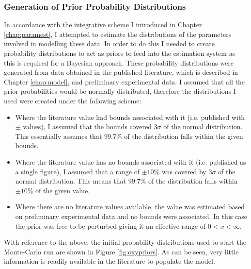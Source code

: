 \subsubsection{Generation of Prior Probability Distributions}
In accordance with the integrative scheme I introduced in Chapter \ref{chap:paramest}, I attempted to estimate the distributions of the parameters involved in modelling these data. In order to do this I needed to create probability distributions to act as priors to feed into the estimation system as this is required for a Bayesian approach. These probability distributions were generated from data obtained in the published literature, which is described in Chapter \ref{chap:model}, and preliminary experimental data. I assumed that all the prior probabilities would be normally distributed, therefore the distributions I used were created under the following scheme:
\begin{itemize}
	\item Where the literature value had bounds associated with it (i.e. published with $\pm{}$ values), I assumed that the bounds covered $3 \sigma$ of the normal distribution. This essentially assumes that 99.7\% of the distribution falls within the given bounds.
	\item Where the literature value has no bounds associated with it (i.e. published as a single figure), I assumed that a range of $\pm 10\%$ was covered by $3 \sigma$ of the normal distribution. This means that 99.7\% of the distribution falls within $\pm 10\%$ of the given value.
	\item Where there are no literature values available, the value was estimated based on preliminary experimental data and no bounds were associated. In this case the prior was free to be perturbed giving it an effective range of $0 < x < \infty$.
\end{itemize}
With reference to the above, the initial probability distributions used to start the Monte-Carlo run are shown in Figure \ref{fig:oxypriors}. As can be seen, very little information is readily available in the literature to populate the model.

